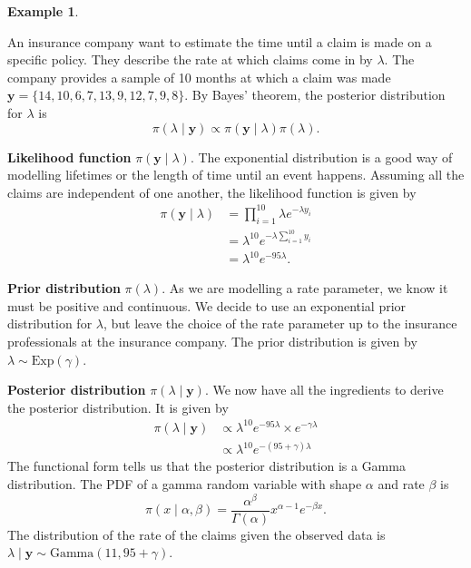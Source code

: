 \documentclass[
]{book}
\theoremstyle{definition}
\theoremstyle{definition}
\newtheorem{example}{Example}[chapter]
\theoremstyle{definition}
\theoremstyle{definition}
\theoremstyle{remark}
\begin{document}
\begin{example}
\protect\hypertarget{exm:exponential}{}\label{exm:exponential}

An insurance company want to estimate the time until a claim is made on a specific policy. They describe the rate at which claims come in by \(\lambda\). The company provides a sample of 10 months at which a claim was made \(\boldsymbol{y} = \{14, 10,  6,  7, 13,  9, 12,  7,  9,  8\}\). By Bayes' theorem, the posterior distribution for \(\lambda\) is
\[
\pi(\lambda \mid \boldsymbol{y}) \propto \pi(\boldsymbol{y} \mid \lambda) \pi(\lambda).
\]

\textbf{Likelihood function} \(\pi(\boldsymbol{y} \mid \lambda)\). The exponential distribution is a good way of modelling lifetimes or the length of time until an event happens. Assuming all the claims are independent of one another, the likelihood function is given by
\begin{align*}
\pi(\boldsymbol{y} \mid \lambda) &= \prod_{i=1}^{10} \lambda e^{-\lambda y_i} \\
& = \lambda^{10}e^{-\lambda \sum_{i=1}^{10} y_i} \\
& = \lambda^{10} e^{-95\lambda}.
\end{align*}

\textbf{Prior distribution} \(\pi(\lambda)\). As we are modelling a rate parameter, we know it must be positive and continuous. We decide to use an exponential prior distribution for \(\lambda\), but leave the choice of the rate parameter up to the insurance professionals at the insurance company. The prior distribution is given by \(\lambda \sim \textrm{Exp}(\gamma).\)

\textbf{Posterior distribution} \(\pi(\lambda \mid \boldsymbol{y})\). We now have all the ingredients to derive the posterior distribution. It is given by
\begin{align*}
\pi(\lambda \mid \boldsymbol{y}) &\propto \lambda^{10} e^{-95\lambda} \times e^{-\gamma\lambda} \\
& \propto \lambda^{10}e^{-(95 + \gamma)\lambda}
\end{align*}
The functional form tells us that the posterior distribution is a Gamma distribution. The PDF of a gamma random variable with shape \(\alpha\) and rate \(\beta\) is
\[
\pi(x \mid \alpha, \beta) = \frac{\alpha^\beta}{\Gamma(\alpha)}x^{\alpha-1}e^{-\beta x}.
\]
The distribution of the rate of the claims given the observed data is \(\lambda \mid \boldsymbol{y} \sim \textrm{Gamma}(11, 95 + \gamma)\).


\end{example}
\end{document}
